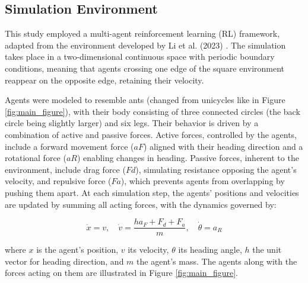\documentclass[9pt]{IEEEtran}
\begin{document}
\subsection{Simulation Environment}

This study employed a multi-agent reinforcement learning (RL) framework, adapted from the environment developed by Li et al. (2023) \cite{li2023predator}. The simulation takes place in a two-dimensional continuous space with periodic boundary conditions, meaning that agents crossing one edge of the square environment reappear on the opposite edge, retaining their velocity.

Agents were modeled to resemble ants (changed from unicycles like in Figure \ref{fig:main_figure}), with their body consisting of three connected circles (the back circle being slightly larger) and six legs. Their behavior is driven by a combination of active and passive forces. Active forces, controlled by the agents, include a forward movement force ($aF$) aligned with their heading direction and a rotational force ($aR$) enabling changes in heading. Passive forces, inherent to the environment, include drag force ($Fd$), simulating resistance opposing the agent's velocity, and repulsive force ($Fa$), which prevents agents from overlapping by pushing them apart. At each simulation step, the agents' positions and velocities are updated by summing all acting forces, with the dynamics governed by:

$$ \dot{x} = v, \quad \dot{v} = \frac{ha_F + F_d + F_a}{m}, \quad \dot{\theta} = a_R $$  

where $x$ is the agent's position, $v$ its velocity, $\theta$ its heading angle, $h$ the unit vector for heading direction, and $m$ the agent's mass. The agents along with the forces acting on them are illustrated in Figure \ref{fig:main_figure}.
\end{document}
